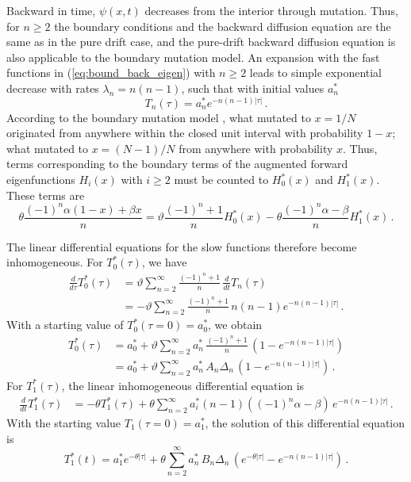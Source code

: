\documentclass[preprint]{elsarticle}
\begin{document}
{Backward in time, $\psi(x,t)$ decreases from the interior through mutation. Thus, for $n\geq 2$ the boundary conditions and the backward diffusion equation are the same as in the pure drift case, and the pure-drift backward diffusion equation is also applicable to the boundary mutation model. An expansion with the fast functions in (\ref{eq:bound_back_eigen}) with $n\geq 2$ leads to simple exponential decrease with rates $\lambda_n=n(n-1)$, such that with initial values $a_n^{*}$
\begin{equation}
    T_n(\tau)=a_n^{*} e^{-n(n-1)|\tau|}\,.
\end{equation}
According to the boundary mutation model \citep{Vogl15}, what mutated to $x=1/N$ originated from anywhere within the closed unit interval with probability $1-x$; what mutated to $x=(N-1)/N$ from anywhere with probability $x$. Thus, terms corresponding to the boundary terms of the augmented forward eigenfunctions $H_i(x)$ with $i\geq 2$ must be counted to $H_0^{*}(x)$ and $H_1^{*}(x)$. These terms are
\begin{equation}
    \theta \frac{(-1)^n \alpha (1-x) +\beta x}{n}=\vartheta\frac{(-1)^n+1}{n}H_0^{*}(x)-\theta\frac{(-1)^n\alpha-\beta}{n}H_1^{*}(x)\,.
\end{equation}

The linear differential equations for the slow functions therefore become inhomogeneous.
For $T_0^{*}(\tau)$, we have
\begin{equation}
\begin{split}
    \frac{d}{d\tau} T_0^{*}(\tau)&=\vartheta\sum_{n=2}^\infty \frac{(-1)^n+1}{n}\,\frac{d}{dt} T_n(\tau)\\
    &=-\vartheta\sum_{n=2}^\infty \frac{(-1)^n+1}{n}\,n(n-1)e^{-n(n-1) |\tau|}\,.
\end{split}
\end{equation}
With a starting value of $T_0^{*}(\tau=0)=a_0^{*}$, we obtain
\begin{equation}
\begin{split}
    T_0^{*}(\tau)&=a_0^{*}+\vartheta\sum_{n=2}^\infty a_n^{*}\,\frac{(-1)^n+1}{n}\, (1- e^{-n(n-1) |\tau|})\\
        &=a_0^{*}+\vartheta\sum_{n=2}^\infty a_n^{*}\,A_n\Delta_n\, (1- e^{-n(n-1) |\tau|})\,.
\end{split}
\end{equation}
For $T_1^{*}(\tau)$, the linear inhomogeneous differential equation is 
\begin{equation}
\begin{split}
    \frac{d}{dt} T_1^{*}(\tau)&=-\theta T_1^{*} (\tau)
    +\theta\sum_{n=2}^\infty a_i^{*} (n-1)((-1)^n\alpha-\beta)\,e^{-n(n-1) |\tau|} \,.
\end{split}
\end{equation}
With the starting value $T_1(\tau=0)=a_1^{*}$, the solution of this differential equation is
\begin{equation}
    T_1^{*}(t)=a_1^{*} e^{-\theta |\tau|} 
    +\theta\sum_{n=2}^\infty a_n^{*}\,B_n\Delta_n\,  (e^{-\theta |\tau|}- e^{-n(n-1) |\tau|}) \,.
\end{equation}

}
\end{document}
